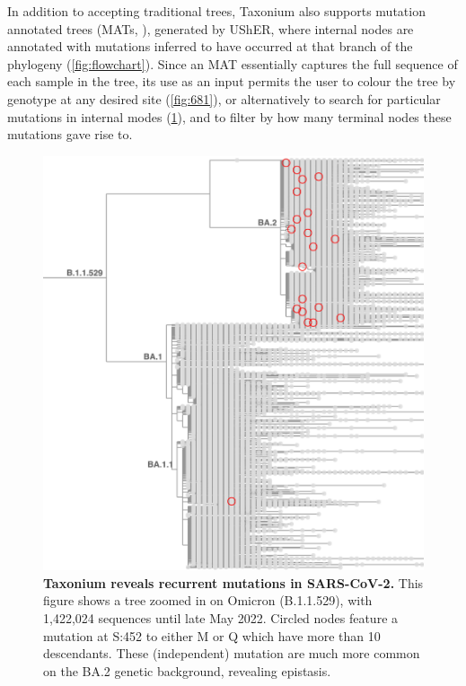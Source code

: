 In addition to accepting traditional trees, Taxonium also supports mutation annotated trees (MATs, \citet{matutils}), generated by UShER, where internal nodes are annotated with mutations inferred to have occurred at that branch of the phylogeny (\cref{fig:flowchart}). Since an MAT essentially captures the full sequence of each sample in the tree, its use as an input permits the user to colour the tree by genotype at any desired site (\cref{fig:681}), or alternatively to search for particular mutations in internal modes (\cref{fig:452}), and to filter by how many terminal nodes these mutations gave rise to.



\begin{figure}
\begin{center}
\includegraphics[width=\linewidth]{Figures/452_2.png}
\end{center}
\caption{\textbf{Taxonium reveals recurrent mutations in SARS-CoV-2.} This figure shows a tree zoomed in on Omicron (B.1.1.529), with 1,422,024 sequences until late May 2022. Circled nodes feature a mutation at S:452 to either M or Q which have more than 10 descendants. These (independent) mutation are much more common on the BA.2 genetic background, revealing epistasis.}
\label{fig:452}
\end{figure}

